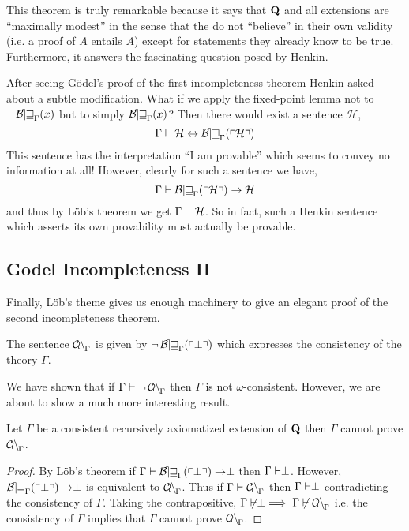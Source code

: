 \documentclass[12pt]{article}
\begin{document}
\begin{remark}
This theorem is truly remarkable because it says that $\bf{Q}$ and all extensions are ``maximally modest'' in the sense that the do not ``believe'' in their own validity (i.e. a proof of $A$ entails $A$) except for statements they already know to be true. Furthermore, it answers the fascinating question posed by Henkin. 
\end{remark}

\begin{remark}
After seeing G\"{o}del's proof of the first incompleteness theorem Henkin asked about a subtle modification. What if we apply the fixed-point lemma not to $\neg \Bew_{\Gamma}(x)$ but to simply $\Bew_{\Gamma}(x)$? Then there would exist a sentence $\mathcal{H}$,
\[ \Gamma \proves \mathcal{H} \leftrightarrow \Thm{\mathcal{H}} \]
This sentence has the interpretation ``I am provable'' which seems to convey no information at all! However, clearly for such a sentence we have,
\[ \Gamma \proves \Thm{\mathcal{H}} \to \mathcal{H} \]
and thus by L\"{o}b's theorem we get $\Gamma \proves \mathcal{H}$. So in fact, such a Henkin sentence which asserts its own provability must actually be provable.  
\end{remark}

\subsection{Godel Incompleteness II}

Finally, L\"{o}b's theme gives us enough machinery to give an elegant proof of the second incompleteness theorem. 

\begin{definition}
The sentence $\Con_{\Gamma}$ is given by $\neg \Thm{\perp}$ which expresses the consistency of the theory $\Gamma$.
\end{definition}

\begin{remark}
We have shown that if $\Gamma \proves \neg \Con_{\Gamma}$ then $\Gamma$ is not $\omega$-consistent. However, we are about to show a much more interesting result.
\end{remark}

\begin{theorem}[G\"{o}del]
Let $\Gamma$ be a consistent recursively axiomatized extension of $\bf{Q}$ then $\Gamma$ cannot prove $\Con_{\Gamma}$. 
\end{theorem}

\begin{proof}
By L\"{o}b's theorem if $\Gamma \proves \Thm{\perp} \to \perp$ then $\Gamma \proves \perp$. However, $\Thm{\perp} \to \perp$ is equivalent to $\Con_{\Gamma}$. Thus if $\Gamma \proves \Con_{\Gamma}$ then $\Gamma \proves \perp$ contradicting the consistency of $\Gamma$. Taking the contrapositive, $\Gamma \not\proves \perp \implies \Gamma \not\proves \Con_{\Gamma}$ i.e. the consistency of $\Gamma$ implies  that $\Gamma$ cannot prove $\Con_{\Gamma}$.
\end{proof}
\end{document}
